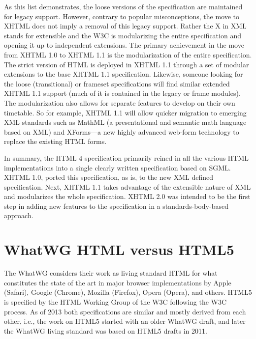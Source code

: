 As this list demonstrates, the loose versions of the specification are maintained for legacy support. However, contrary to popular misconceptions, the move to XHTML does not imply a removal of this legacy support. Rather the X in XML stands for extensible and the W3C is modularizing the entire specification and opening it up to independent extensions. The primary achievement in the move from XHTML 1.0 to XHTML 1.1 is the modularization of the entire specification. The strict version of HTML is deployed in XHTML 1.1 through a set of modular extensions to the base XHTML 1.1 specification. Likewise, someone looking for the loose (transitional) or frameset specifications will find similar extended XHTML 1.1 support (much of it is contained in the legacy or frame modules). The modularization also allows for separate features to develop on their own timetable. So for example, XHTML 1.1 will allow quicker migration to emerging XML standards such as MathML (a presentational and semantic math language based on XML) and XForms—a new highly advanced web-form technology to replace the existing HTML forms.

In summary, the HTML 4 specification primarily reined in all the various HTML implementations into a single clearly written specification based on SGML. XHTML 1.0, ported this specification, as is, to the new XML defined specification. Next, XHTML 1.1 takes advantage of the extensible nature of XML and modularizes the whole specification. XHTML 2.0 was intended to be the first step in adding new features to the specification in a standards-body-based approach.


\section{WhatWG HTML versus HTML5}


The WhatWG considers their work as living standard HTML for what constitutes the state of the art in major browser implementations by Apple (Safari), Google (Chrome), Mozilla (Firefox), Opera (Opera), and others. HTML5 is specified by the HTML Working Group of the W3C following the W3C process. As of 2013 both specifications are similar and mostly derived from each other, i.e., the work on HTML5 started with an older WhatWG draft, and later the WhatWG living standard was based on HTML5 drafts in 2011.









